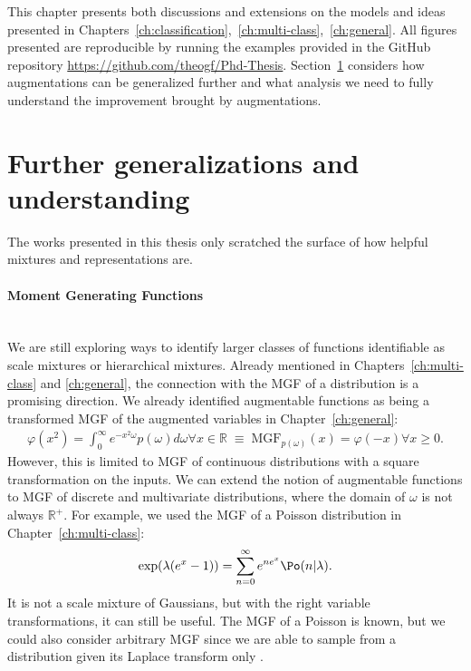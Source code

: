 

\graphicspath{{8/figures/}}
This chapter presents both discussions and extensions on the models and ideas presented in Chapters~\ref{ch:classification},~\ref{ch:multi-class},~\ref{ch:general}.
All figures presented are reproducible by running the examples provided in the GitHub repository \url{https://github.com/theogf/Phd-Thesis}.
Section~\ref{sec:further} considers how augmentations can be generalized further and what analysis we need to fully understand the improvement brought by augmentations.

\section{Further generalizations and understanding}
\label{sec:further}
The works presented in this thesis only scratched the surface of how helpful mixtures and representations are.
\paragraph{Moment Generating Functions}\mbox{}\\
We are still exploring ways to identify larger classes of functions identifiable as scale mixtures or hierarchical mixtures.
Already mentioned in Chapters~\ref{ch:multi-class} and \ref{ch:general},
the connection with the \acf{MGF} of a distribution is a promising direction.
We already identified augmentable functions as being a transformed \ac{MGF} of the augmented variables in Chapter~\ref{ch:general}:
\begin{align*}
    \varphi(x^2) = \int_0^\infty e^{-x^2\omega}p(\omega)d\omega \forall x \in \mathbb{R} \;\equiv\; \mathrm{MGF}_{p(\omega)}(x) = \varphi(-x) \forall x \geq 0.
\end{align*}
However, this is limited to \ac{MGF} of continuous distributions with a square transformation on the inputs.
We can extend the notion of augmentable functions to \ac{MGF} of discrete and multivariate distributions, where the domain of $\omega$ is not always $\mathbb{R}^+$.
For example, we used the \ac{MGF} of a Poisson distribution in Chapter~\ref{ch:multi-class}:
\begin{align*}
    \exp(\lambda(e^x - 1)) = \sum_{n=0}^\infty e^{n e^x} \Po(n|\lambda).
\end{align*}
It is not a scale mixture of Gaussians, but with the right variable transformations, it can still be useful.
The \ac{MGF} of a Poisson is known, but we could also consider arbitrary \ac{MGF} since we are able to sample from a distribution given its Laplace transform only \cite{ridout2009generating}.


